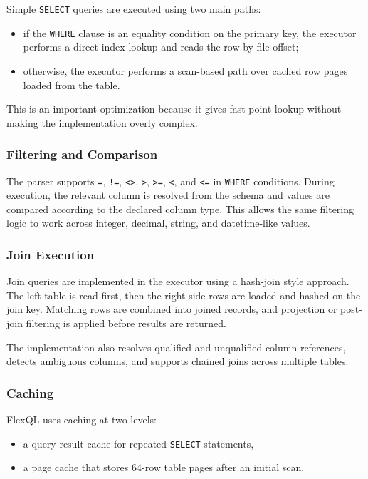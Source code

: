 \documentclass[12pt,a4paper]{article}
\begin{document}
Simple \texttt{SELECT} queries are executed using two main paths:

\begin{itemize}[leftmargin=1.8em]
  \item if the \texttt{WHERE} clause is an equality condition on the primary
        key, the executor performs a direct index lookup and reads the row by
        file offset;
  \item otherwise, the executor performs a scan-based path over cached row
        pages loaded from the table.
\end{itemize}

This is an important optimization because it gives fast point lookup without
making the implementation overly complex.

\subsubsection{Filtering and Comparison}

The parser supports \texttt{=}, \texttt{!=}, \texttt{<>}, \texttt{>},
\texttt{>=}, \texttt{<}, and \texttt{<=} in \texttt{WHERE} conditions. During
execution, the relevant column is resolved from the schema and values are
compared according to the declared column type. This allows the same filtering
logic to work across integer, decimal, string, and datetime-like values.

\subsubsection{Join Execution}

Join queries are implemented in the executor using a hash-join style approach.
The left table is read first, then the right-side rows are loaded and hashed on
the join key. Matching rows are combined into joined records, and projection or
post-join filtering is applied before results are returned.

The implementation also resolves qualified and unqualified column references,
detects ambiguous columns, and supports chained joins across multiple tables.

\subsubsection{Caching}

FlexQL uses caching at two levels:

\begin{itemize}[leftmargin=1.8em]
  \item a query-result cache for repeated \texttt{SELECT} statements,
  \item a page cache that stores 64-row table pages after an initial scan.
\end{itemize}
\end{document}
